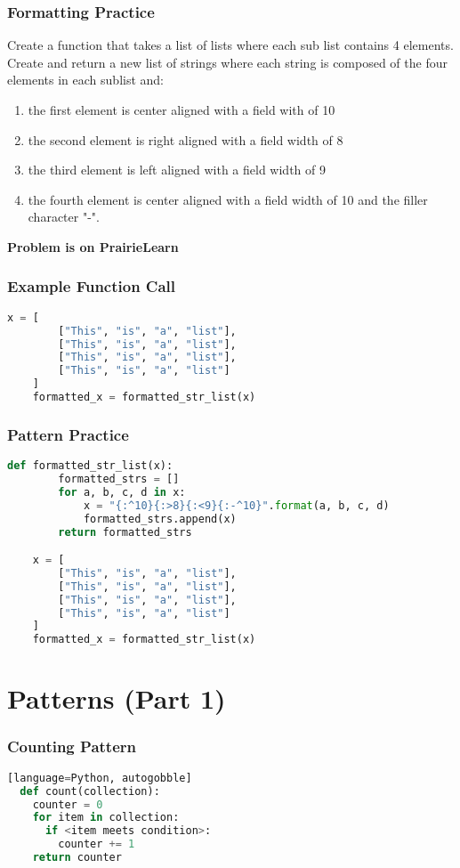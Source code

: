 \documentclass{beamer}
\begin{document}
\begin{frame}[fragile]
  \frametitle{Formatting Practice}
	Create a function that takes a list of lists where each sub list contains 4
	elements. Create and return a new list of strings where each string is composed
	of the four elements in each sublist and:
	\begin{enumerate}
		\item the first element is center aligned with a field with of 10
		\item the second element is right aligned with a field width of 8
		\item the third element is left aligned with a field width of 9
		\item the fourth element is center aligned with a field width of 10 and the filler character "-".
	\end{enumerate}
	\textbf{Problem is on PrairieLearn}
\end{frame}

%
%
\begin{frame}[fragile]
  \frametitle{Example Function Call}
  \begin{lstlisting}[language=Python, autogobble]
	x = [
		["This", "is", "a", "list"],
		["This", "is", "a", "list"],
		["This", "is", "a", "list"],
		["This", "is", "a", "list"]
	]
	formatted_x = formatted_str_list(x)
  \end{lstlisting}
\end{frame}


%
%
\begin{frame}[fragile]
  \frametitle{Pattern Practice}
  \begin{lstlisting}[language=Python, autogobble]
	def formatted_str_list(x):
		formatted_strs = []
		for a, b, c, d in x:
			x = "{:^10}{:>8}{:<9}{:-^10}".format(a, b, c, d)
			formatted_strs.append(x)
		return formatted_strs

	x = [
		["This", "is", "a", "list"],
		["This", "is", "a", "list"],
		["This", "is", "a", "list"],
		["This", "is", "a", "list"]
	]
	formatted_x = formatted_str_list(x)
  \end{lstlisting}
\end{frame}

\section{Patterns (Part 1)}

%
%
\begin{frame}[fragile]
  \frametitle{Counting Pattern}
  \begin{lstlisting}[language=Python, autogobble][language=Python, autogobble]
  def count(collection):
    counter = 0
    for item in collection:
      if <item meets condition>:
        counter += 1
    return counter
  \end{lstlisting}
\end{frame}
\end{document}
